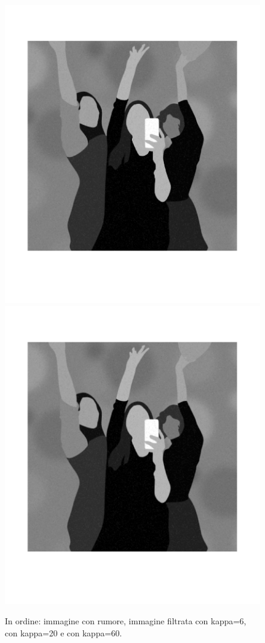 \begin{figure}[htb]
\includegraphics[scale=0.15,trim={0 5cm 0 3cm},clip]{Pictures/Esempi di utilizzo/Esempio 4/party_filtrata_kappa20.png}
\includegraphics[scale=0.15,trim={0 5cm 0 3cm},clip]{Pictures/Esempi di utilizzo/Esempio 4/party_filtrata_kappa60.png}
\caption{In ordine: immagine con rumore, immagine filtrata con kappa=6, con kappa=20 e con kappa=60.}\label{fig:figura}
\end{figure} 
